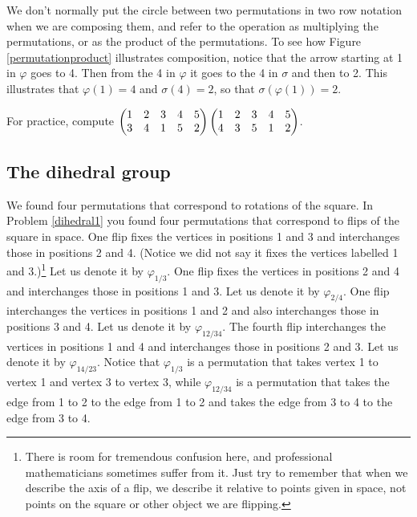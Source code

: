  We don't normally put the circle between two
permutations in two row notation when we are composing them, and refer to
the operation as multiplying the permutations, or as the product of the
permutations. To see how  Figure
\ref{permutationproduct} illustrates composition, notice that the arrow
starting at 1 in
$\varphi$ goes to 4.  Then from the 4 in $\varphi$ it goes to the 4 in
$\sigma$ and then to 2.  This illustrates that $\varphi(1)=4$ and
$\sigma(4) =2$, so that
$\sigma(\varphi(1))=2$.  

\bp
\item For practice, compute $\begin{pmatrix}1&2&3&4&5\cr3&4&1&5&2\end{pmatrix}
\begin{pmatrix}1&2&3&4&5\cr 4&3&5&1&2\end{pmatrix}$.
\ep

\subsection{The dihedral group}
We found four permutations that correspond to rotations of the square. 
In Problem \ref{dihedral1} you found four permutations that correspond to
flips of the square in space.  One flip fixes the vertices in positions 1
and 3 and interchanges those in positions 2 and 4.  (Notice we did not say
it fixes the vertices labelled 1 and 3.)\footnote{There is room for tremendous confusion
here, and professional mathematicians sometimes suffer from it.  Just try to remember
that when we describe the axis of a flip, we describe it relative to points given in
space, not points on the square or other object we are flipping.}  Let us denote it by
$\varphi_{1/3}$.  One flip fixes the vertices in positions 2 and 4 and
interchanges those in positions 1 and 3.  Let us denote it by
$\varphi_{2/4}$.  One flip interchanges the vertices in positions 
1 and 2 and also interchanges those in positions 3 and 4.  Let us denote
it by
$\varphi_{12/34}$. The fourth flip interchanges the vertices in positions
1 and 4 and interchanges those in positions 2 and 3.  Let us denote it by
$\varphi_{14/23}$. Notice that $\varphi_{1/3}$ is a permutation that takes vertex
1 to vertex 1 and vertex 3 to vertex 3, while $\varphi_{12/34}$ is a permutation
that takes the edge from 1 to 2 to the edge from 1 to 2 and takes the edge from 3
to 4 to the edge from 3 to 4.

